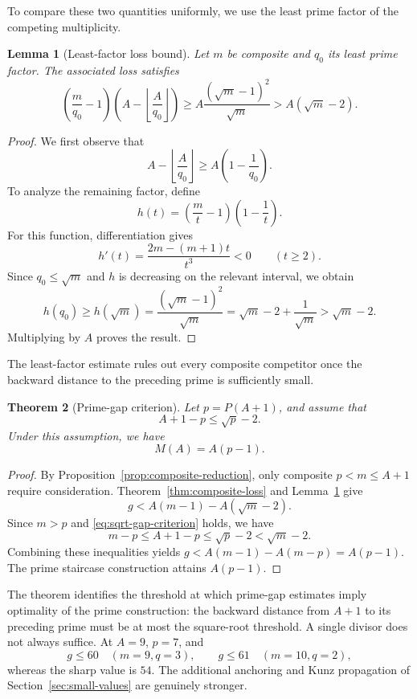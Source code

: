 \documentclass[11pt]{article}
\theoremstyle{plain}
\newtheorem{theorem}{Theorem}[section]
\newtheorem{lemma}[theorem]{Lemma}
\theoremstyle{definition}
\theoremstyle{remark}
\begin{document}
To compare these two quantities uniformly, we use the least prime factor of
the competing multiplicity.

\begin{lemma}[Least-factor loss bound]\label{lem:least-factor-loss}
Let $m$ be composite and $q_0$ its least prime factor.  The associated loss
satisfies
\[
  \boxed{
  \left(\frac{m}{q_0}-1\right)
  \left(A-\left\lfloor\frac{A}{q_0}\right\rfloor\right)
  \geq A\frac{(\sqrt m-1)^2}{\sqrt m}
  >A(\sqrt m-2).}
\]
\end{lemma}

\begin{proof}
We first observe that
\[
  A-\left\lfloor\frac A{q_0}\right\rfloor
  \geq A\left(1-\frac1{q_0}\right).
\]
To analyze the remaining factor, define
\[
  h(t)=\left(\frac mt-1\right)\left(1-\frac1t\right).
\]
For this function, differentiation gives
\[
  h'(t)=\frac{2m-(m+1)t}{t^3}<0
  \qquad(t\geq2).
\]
Since $q_0\leq\sqrt m$ and $h$ is decreasing on the relevant interval, we
obtain
\[
  h(q_0)\geq h(\sqrt m)
  =\frac{(\sqrt m-1)^2}{\sqrt m}
  =\sqrt m-2+\frac1{\sqrt m}>\sqrt m-2.
\]
Multiplying by $A$ proves the result.
\end{proof}

The least-factor estimate rules out every composite competitor once the
backward distance to the preceding prime is sufficiently small.

\begin{theorem}[Prime-gap criterion]\label{thm:prime-gap-criterion}
Let $p=P(A+1)$, and assume that
\begin{equation}\label{eq:sqrt-gap-criterion}
  \boxed{A+1-p\leq\sqrt p-2}.
\end{equation}
Under this assumption, we have
\[
  \boxed{M(A)=A(p-1).}
\]
\end{theorem}

\begin{proof}
By Proposition~\ref{prop:composite-reduction}, only composite
$p<m\leq A+1$ require consideration.  Theorem~\ref{thm:composite-loss} and
Lemma~\ref{lem:least-factor-loss} give
\[
  g<A(m-1)-A(\sqrt m-2).
\]
Since $m>p$ and \eqref{eq:sqrt-gap-criterion} holds, we have
\[
  m-p\leq A+1-p\leq\sqrt p-2<\sqrt m-2.
\]
Combining these inequalities yields
$g<A(m-1)-A(m-p)=A(p-1)$.  The prime staircase construction
attains $A(p-1)$.
\end{proof}

The theorem identifies the threshold at which prime-gap estimates imply
optimality of the prime construction: the backward distance from $A+1$ to
its preceding prime must be at most the square-root threshold.  A single
divisor does not always suffice.  At $A=9$, $p=7$, and
\[
  g\leq60\quad(m=9,q=3),
  \qquad g\leq61\quad(m=10,q=2),
\]
whereas the sharp value is $54$.  The additional anchoring and Kunz
propagation of Section~\ref{sec:small-values} are genuinely stronger.
\end{document}
